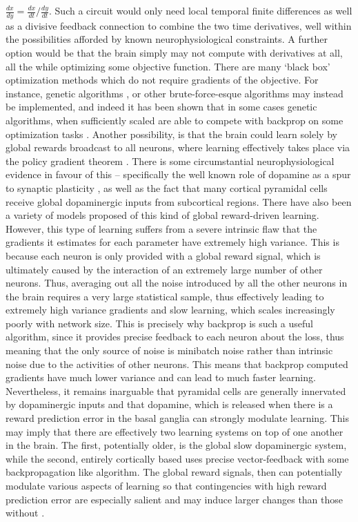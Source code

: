 $\frac{dx}{dy} = \frac{dx}{dt} / \frac{dy}{dt}$. Such a circuit would only need local temporal finite differences as well as a divisive feedback connection to combine the two time derivatives, well within the possibilities afforded by known neurophysiological constraints. A further option would be that the brain simply may not compute with derivatives at all, all the while optimizing some objective function. There are many `black box' optimization methods which do not require gradients of the objective. For instance, genetic algorithms \citep{salimans2017evolution}, or other brute-force-esque algorithms may instead be implemented, and indeed it has been shown that in some cases genetic algorithms, when sufficiently scaled are able to compete with backprop on some optimization tasks \citep{salimans2017evolution,such2017deep}. Another possibility, is that the brain could learn solely by global rewards broadcast to all neurons, where learning effectively takes place via the policy gradient theorem \citep{roelfsema2005attention}. There is some circumstantial neurophysiological evidence in favour of this -- specifically the well known role of dopamine as a spur to synaptic plasticity \citep{dayan2009goal,dayan2008decision}, as well as the fact that many cortical pyramidal cells receive global dopaminergic inputs from subcortical regions. There have also been a variety of models \citep{roelfsema2005attention,pozzi2018biologically} proposed of this kind of global reward-driven learning. However, this type of learning suffers from a severe intrinsic flaw that the gradients it estimates for each parameter have extremely high variance. This is because each neuron is only provided with a global reward signal, which is ultimately caused by the interaction of an extremely large number of other neurons. Thus, averaging out all the noise introduced by all the other neurons in the brain requires a very large statistical sample, thus effectively leading to extremely high variance gradients and slow learning, which scales increasingly poorly with network size. This is precisely why backprop is such a useful algorithm, since it provides precise feedback to each neuron about the loss, thus meaning that the only source of noise is minibatch noise rather than intrinsic noise due to the activities of other neurons. This means that backprop computed gradients have much lower variance and can lead to much faster learning. Nevertheless, it remains inarguable that pyramidal cells are generally innervated by dopaminergic inputs and that dopamine, which is released when there is a reward prediction error in the basal ganglia \citep{schultz1998predictive,schultz1998reward,dayan2009goal} can strongly modulate learning. This may imply that there are effectively two learning systems on top of one another in the brain. The first, potentially older, is the global slow dopaminergic system, while the second, entirely cortically based uses precise vector-feedback with some backpropagation like algorithm. The global reward signals, then can potentially modulate various aspects of learning so that contingencies with high reward prediction error are especially salient and may induce larger changes than those without \citep{daw2006cortical,roelfsema2005attention}.

